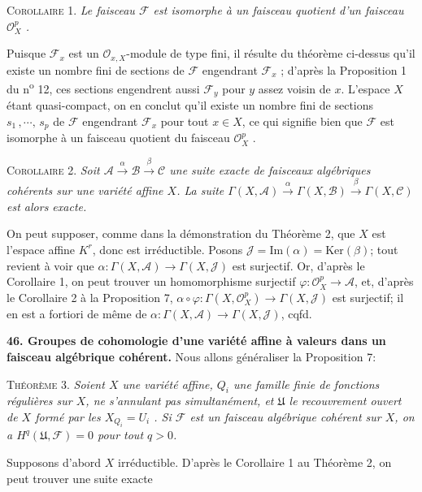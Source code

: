 \textsc{Corollaire} 1. \textit{Le faisceau $\mathcal{F}$ est isomorphe à un faisceau quotient d'un faisceau $\mathcal{O}_X^p$ .}

Puisque $\mathcal{F}_x$ est un $\mathcal{O}_{x,X}$-module de type fini, il résulte du théorème ci-dessus qu'il existe un nombre fini de sections de $\mathcal{F}$ engendrant $\mathcal{F}_x$ ; d'après la Proposition 1 du n\textsuperscript{o} 12, ces sections engendrent aussi $\mathcal{F}_y$ pour $y$ assez voisin de $x$. L'espace $X$ étant quasi-compact, on en conclut qu'il existe un nombre fini de sections $s_1 \, , \cdots , \, s_p$ de $\mathcal{F}$ engendrant $\mathcal{F}_x$ pour tout $x \in X$, ce qui signifie bien que $\mathcal{F}$ est isomorphe à un faisceau quotient du faisceau $\mathcal{O}_X^p$ .

\textsc{Corollaire} 2. \textit{Soit $\mathcal{A} \xrightarrow{\ \alpha\ } \mathcal{B} \xrightarrow{\ \beta\ } \mathcal{C}$ une suite exacte de faisceaux algébriques cohérents sur une variété affine $X$. La suite $\Gamma(X, \mathcal{A}) \xrightarrow{\ \alpha\ } \Gamma(X, \mathcal{B}) \xrightarrow{\ \beta\ } \Gamma(X, \mathcal{C})$ est alors exacte.}

On peut supposer, comme dans la démonstration du Théorème 2, que $X$ est l'espace affine $K^r$, donc est irréductible. Posons $\mathcal{J} = \mathrm{Im}(\alpha) = \mathrm{Ker}(\beta)$; tout revient à voir que $\alpha : \Gamma(X, \mathcal{A}) \to \Gamma(X, \mathcal{J})$ est surjectif. Or, d'après le Corollaire 1, on peut trouver un homomorphisme surjectif $\varphi : \mathcal{O}_X^p \to \mathcal{A}$, et, d'après le Corollaire 2 à la Proposition 7, $\alpha \circ \varphi : \Gamma(X, \mathcal{O}_X^p) \to \Gamma(X, \mathcal{J})$ est surjectif; il en est a fortiori de même de $\alpha : \Gamma(X, \mathcal{A}) \to \Gamma(X, \mathcal{J})$, cqfd.


\textbf{46. Groupes de cohomologie d'une variété affine à valeurs dans un faisceau algébrique cohérent.} Nous allons généraliser la Proposition 7:

\textsc{Théorème} 3. \textit{Soient $X$ une variété affine, $Q_i$ une famille finie de fonctions régulières sur $X$, ne s'annulant pas simultanément, et $\mathfrak{U}$ le recouvrement ouvert de $X$ formé par les $X_{Q_i} = U_i$ . Si $\mathcal{F}$ est un faisceau algébrique cohérent sur $X$, on a $H^q(\mathfrak{U}, \mathcal{F}) = 0$ pour tout $q > 0$.}

Supposons d'abord $X$ irréductible. D'après le Corollaire 1 au Théorème 2, on peut trouver une suite exacte

